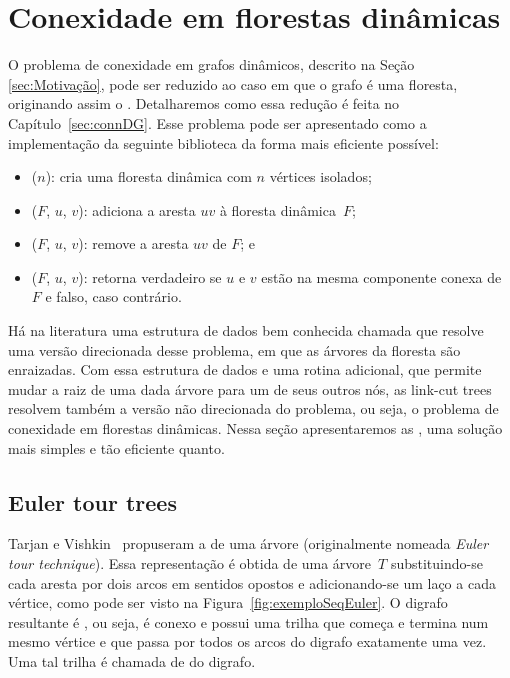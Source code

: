 \chapter{Conexidade em florestas dinâmicas}
\label{sec:connDF}

O problema de conexidade em grafos dinâmicos, descrito na Seção \ref{sec:Motivação}, pode ser reduzido ao caso em que o grafo é uma floresta, originando assim o . Detalharemos como essa redução é feita no Capítulo~\ref{sec:connDG}. Esse problema pode ser apresentado como a implementação da seguinte biblioteca da forma mais eficiente possível: 

\begin{itemize}
\item \dymForestCreate($n$): cria uma floresta dinâmica com $n$ vértices isolados;
\item \dymForestAddEdge($F$, $u$, $v$): adiciona a aresta $uv$ à floresta dinâmica~$F$;
\item \dymForestDelEdge($F$, $u$, $v$): remove a aresta $uv$ de $F$; e
\item \dymForestQuery($F$, $u$, $v$): retorna verdadeiro se $u$ e $v$ estão na mesma componente conexa de $F$ e falso, caso contrário.
\end{itemize}
 
Há na literatura uma estrutura de dados bem conhecida chamada  \cite{SleatroTarjanLinkCutTree1983} que resolve uma versão direcionada desse problema, em que as árvores da floresta são enraizadas. Com essa estrutura de dados e uma rotina adicional, que permite mudar a raiz de uma dada árvore para um de seus outros nós, as link-cut trees resolvem também a versão não direcionada do problema, ou seja, o problema de conexidade em florestas dinâmicas. Nessa seção apresentaremos as , uma solução mais simples e tão eficiente quanto.


\section{Euler tour trees} 

Tarjan e Vishkin~\cite{tarjan1985} propuseram a  de uma árvore (originalmente nomeada \textit{Euler tour technique}).
Essa representação é obtida de uma árvore~$T$ substituindo-se cada aresta por dois arcos em sentidos opostos e adicionando-se um laço a cada vértice, como pode ser visto na Figura~\ref{fig:exemploSeqEuler}. O digrafo resultante é , ou seja, é conexo e possui uma trilha que começa e termina num mesmo vértice e que passa por todos os arcos do digrafo exatamente uma vez. Uma tal trilha é chamada de  do digrafo.


